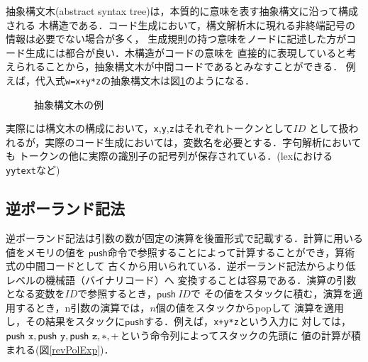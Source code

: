 \documentclass[dvipdfmx,a4j]{jbook}
\begin{document}
抽象構文木(abstract syntax tree)は，本質的に意味を表す抽象構文に沿って構成される
木構造である．コード生成において，構文解析木に現れる非終端記号の情報は必要でない場合が多く，
生成規則の持つ意味をノードに記述した方がコード生成には都合が良い．木構造がコードの意味を
直接的に表現していると考えられることから，抽象構文木が中間コードであるとみなすことができる．
例えば，代入式\texttt{w=x+y*z}の抽象構文木は図\ref{ASTexample}のようになる．
\begin{figure}[t]
    \centering
    \caption{抽象構文木の例}\label{ASTexample}
\end{figure}

実際には構文木の構成において，\texttt{x},\texttt{y},\texttt{z}はそれぞれトークンとして$ID$
として扱われるが，実際のコード生成においては，変数名を必要とする．字句解析においても
トークンの他に実際の識別子の記号列が保存されている．(lexにおける\texttt{yytext}など)

\subsection{逆ポーランド記法}

逆ポーランド記法は引数の数が固定の演算を後置形式で記載する．計算に用いる値をメモリの値を
$\mathsf{push}$命令で参照することによって計算することができ，算術式の中間コードとして
古くから用いられている．逆ポーランド記法からより低レベルの機械語（バイナリコード）へ
変換することは容易である．演算の引数となる変数を$ID$で参照するとき，$\mathsf{push}\ ID$で
その値をスタックに積む，演算を適用するとき，n引数の演算では，$n$個の値をスタックからpopして
演算を適用し，その結果をスタックに$\mathsf{push}$する．例えば，\texttt{x+y*z}という入力に
対しては，$\mathsf{push}\ \texttt{x},\mathsf{push}\ \texttt{y},\mathsf{push}\ \texttt{z},{\tt *},{\tt +}$という命令列によってスタックの先頭に
値の計算が積まれる(図\ref{revPolExp})．
\end{document}
